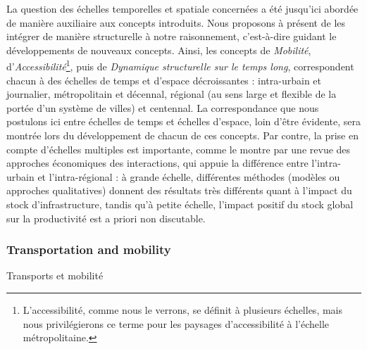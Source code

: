 {La question des échelles temporelles et spatiale concernées a été jusqu'ici abordée de manière auxiliaire aux concepts introduits. Nous proposons à présent de les intégrer de manière structurelle à notre raisonnement, c'est-à-dire guidant le développements de nouveaux concepts. Ainsi, les concepts de \emph{Mobilité}, d'\emph{Accessibilité}\footnote{L'accessibilité, comme nous le verrons, se définit à plusieurs échelles, mais nous privilégierons ce terme pour les paysages d'accessibilité à l'échelle métropolitaine.}, puis de \emph{Dynamique structurelle sur le temps long}, correspondent chacun à des échelles de temps et d'espace décroissantes : intra-urbain et journalier, métropolitain et décennal, régional (au sens large et flexible de la portée d'un système de villes) et centennal. La correspondance que nous postulons ici entre échelles de temps et échelles d'espace, loin d'être évidente, sera montrée lors du développement de chacun de ces concepts. Par contre, la prise en compte d'échelles multiples est importante, comme le montre \cite{RIETVELD1994329} par une revue des approches économiques des interactions, qui appuie la différence entre l'intra-urbain et l'intra-régional : à grande échelle, différentes méthodes (modèles ou approches qualitatives) donnent des résultats très différents quant à l'impact du stock d'infrastructure, tandis qu'à petite échelle, l'impact positif du stock global sur la productivité est a priori non discutable.
}



\subsubsection{Transportation and mobility}{Transports et mobilité}


